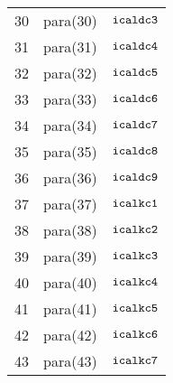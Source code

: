 \documentclass{article}
\begin{document}
\begin{center}
\begin{tabular}{|c|c|c|}
30 & para(30)  & $\mbox{\tt icaldc3}$ \\ 
31 & para(31)  & $\mbox{\tt icaldc4}$ \\ 
32 & para(32)  & $\mbox{\tt icaldc5}$ \\ 
33 & para(33)  & $\mbox{\tt icaldc6}$ \\ 
34 & para(34)  & $\mbox{\tt icaldc7}$ \\ 
35 & para(35)  & $\mbox{\tt icaldc8}$ \\ 
36 & para(36)  & $\mbox{\tt icaldc9}$ \\ 
37 & para(37)  & $\mbox{\tt icalkc1}$ \\ 
38 & para(38)  & $\mbox{\tt icalkc2}$ \\ 
39 & para(39)  & $\mbox{\tt icalkc3}$ \\ 
40 & para(40)  & $\mbox{\tt icalkc4}$ \\ 
41 & para(41)  & $\mbox{\tt icalkc5}$ \\ 
42 & para(42)  & $\mbox{\tt icalkc6}$ \\ 
43 & para(43)  & $\mbox{\tt icalkc7}$ \\ 
\hline
\end{tabular}
\end{center}
\end{document}

